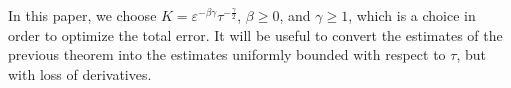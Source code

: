 \documentclass[10pt,a4paper]{article}
\newtheorem{corollary}[theorem]{Corollary}
\begin{document}



  In this paper, we choose \(K=\varepsilon^{-\beta\gamma}\tau^{-\frac\gamma2}\),
  \(\beta\geq0\), and \(\gamma \geq 1\), which is a choice in order to optimize
  the total error. It will be useful to convert the estimates of the previous
  theorem into the estimates uniformly bounded with respect to \(\tau\), but
  with loss of derivatives. 
\end{document}
